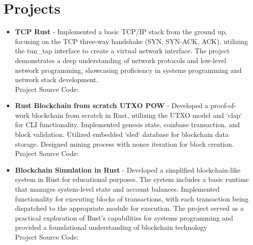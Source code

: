 \documentclass[11pt,a4paper,sans]{moderncv}
\begin{document}
\section{Projects}
\begin{itemize}[label=\textbullet]
	\item \textbf{TCP Rust} - Implemented a basic TCP/IP stack from the ground up, focusing on the TCP three-way handshake (SYN, SYN-ACK, ACK), utilizing the tun\_tap interface to create a virtual network interface. The project demonstrates a deep understanding of network protocols and low-level network programming, showcasing proficiency in systems programming and network stack development. \\
	      Project Source Code: \textcolor{blue}{\href{https://github.com/noormohammedb/rust-tcp-implementation/}{}}

	\item \textbf{Rust Blockchain from scratch UTXO POW} - Developed a proof-of-work blockchain from scratch in Rust, utilizing the UTXO model and `clap` for CLI functionality. Implemented genesis state, coinbase transaction, and block validation. Utilized embedded `sled` database for blockchain data storage. Designed mining process with nonce iteration for block creation. \\
	      Project Source Code: \textcolor{blue}{\href{https://github.com/noormohammedb/blockchain-pow-from-scratch-rust-utxo/}{}}


	\item \textbf{Blockchain Simulation in Rust} - Developed a simplified blockchain-like system in Rust for educational purposes. The system includes a basic runtime that manages system-level state and account balances. Implemented functionality for executing blocks of transactions, with each transaction being dispatched to the appropriate module for execution. The project served as a practical exploration of Rust’s capabilities for systems programming and provided a foundational understanding of blockchain technology  \\
	      Project Source Code: \textcolor{blue}{\href{https://github.com/noormohammedb/rust-state-machine/}{}}

\end{itemize}
\end{document}
